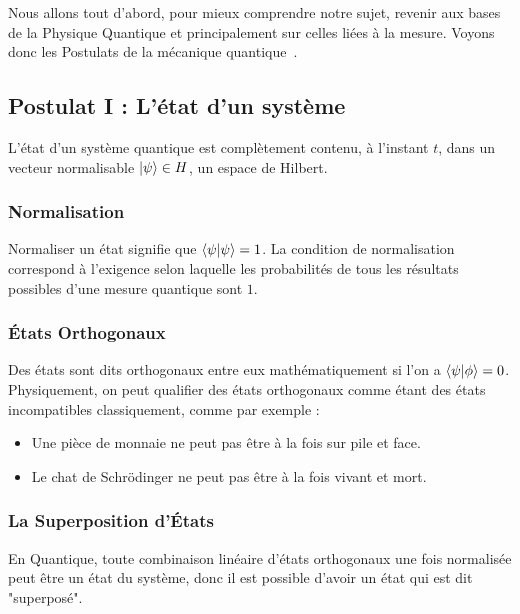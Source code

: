 \documentclass[11pt]{article}
\begin{document}
\qquad Nous allons tout d'abord, pour mieux comprendre notre sujet, revenir aux bases de la Physique Quantique et principalement sur celles liées à la mesure. Voyons donc les Postulats de la mécanique quantique~\cite{wikPM}.

\subsection{Postulat I : L'état d’un système}

L'état d'un système quantique est complètement contenu, à l'instant \( t \), dans un vecteur normalisable \( \ket{\psi} \in H \), un espace de Hilbert.

\subsubsection{Normalisation}

Normaliser un état signifie que \( \braket{\psi|\psi} = 1 \). La condition de normalisation correspond à l’exigence selon laquelle les probabilités de tous les résultats possibles d’une mesure quantique sont \( 1 \).

\subsubsection{États Orthogonaux}

Des états sont dits orthogonaux entre eux mathématiquement si l'on a \( \braket{\psi|\phi} = 0 \).
Physiquement, on peut qualifier des états orthogonaux comme étant des états incompatibles classiquement, comme par exemple :
\vspace{0.3cm}
\begin{itemize}
\renewcommand{\labelitemi}{$\cdot$}
    \item Une pièce de monnaie ne peut pas être à la fois sur pile et face.
    \item Le chat de Schrödinger ne peut pas être à la fois vivant et mort.
\end{itemize}

\subsubsection{La Superposition d'États}

En Quantique, toute combinaison linéaire d'états orthogonaux une fois normalisée peut être un état du système, donc il est possible d'avoir un état qui est dit "superposé".
\vspace{0.5cm}
\end{document}
